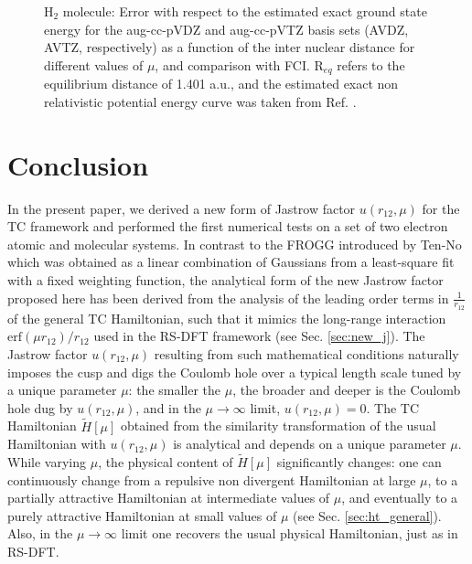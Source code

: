 \documentclass[aip,jcp,reprint,noshowkeys,superscriptaddress,twocolumn]{revtex4-1}
\begin{document}
\begin{figure}
        \caption{
        H$_2$ molecule: Error with respect to the estimated exact ground state energy for the aug-cc-pVDZ and aug-cc-pVTZ basis sets (AVDZ, AVTZ, respectively) as a function of the inter nuclear distance for different values of $\mu$, and comparison with FCI. R$_{eq}$ refers to the equilibrium distance of 1.401 a.u., and the estimated exact non relativistic potential energy curve was taken from Ref. .  
}
 \label{fig:H2}
\end{figure}

\section{Conclusion}
In the present paper, we derived a new form of Jastrow factor $u(r_{12},\mu)$ for the TC framework and performed the first numerical tests on a set of two electron atomic and molecular systems. 
In contrast to the FROGG introduced by Ten-No\cite{TenNo-CPL-00-a} which was obtained as a linear combination of Gaussians from a least-square fit with a fixed weighting function, the analytical form of the new Jastrow factor proposed here has been derived from the analysis of the leading order terms in $\frac{1}{r_{12}}$ of the general TC Hamiltonian, such that it mimics the long-range interaction $\text{erf}(\mu r_{12})/r_{12}$ used in the RS-DFT framework (see Sec. \ref{sec:new_j}). 
The Jastrow factor $u(r_{12},\mu)$ resulting from such mathematical conditions naturally imposes the cusp and digs the Coulomb hole over a typical length scale tuned by a unique parameter $\mu$: the smaller the $\mu$, the broader and deeper is the Coulomb hole dug by $u(r_{12},\mu)$, and in the $\mu \rightarrow \infty$ limit, $u(r_{12},\mu)=0$. 
The TC Hamiltonian $\tilde{H}[\mu]$ obtained from the similarity transformation of the usual Hamiltonian with $u(r_{12},\mu)$ is analytical and depends on a unique parameter $\mu$. 
While varying $\mu$, the physical content of $\tilde{H}[\mu]$ significantly changes: one can continuously change from a repulsive non divergent Hamiltonian at large $\mu$, to a partially attractive Hamiltonian at intermediate values of $\mu$, and eventually to a purely attractive Hamiltonian at small values of $\mu$ (see Sec. \ref{sec:ht_general}). 
Also, in the $\mu \rightarrow \infty$ limit one recovers the usual physical Hamiltonian, just as in RS-DFT. 
 
\end{document}
